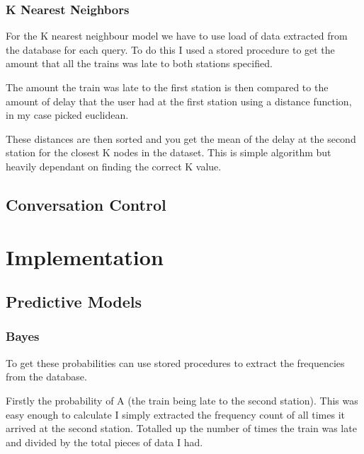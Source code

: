 \documentclass[11pt]{article}
\begin{document}
	\subsubsection{K Nearest Neighbors}		
	
	For the K nearest neighbour model we have to use load of data extracted from the database for each query. To do this I used a stored procedure to get the amount that all the trains was late to both stations specified. 
	
	The amount the train was late to the first station is then compared to the amount of delay that the user had at the first station using a distance function, in my case picked euclidean.
	
	These distances are then sorted and you get the mean of the delay at the second station for the closest K nodes in the dataset. This is simple algorithm but heavily dependant on finding the correct K value.	
	
	\subsection{Conversation Control}
	
	
	\section{Implementation}
	
	\subsection{Predictive Models}
	
	\subsubsection{Bayes}
	To get these probabilities can use stored procedures to extract the frequencies from the database.
	
	Firstly the probability of A (the train being late to the second station). This was easy enough to calculate I simply extracted the frequency count of all times it arrived at the second station. Totalled up the number of times the train was late and divided by the total pieces of data I had.
	
\end{document}
